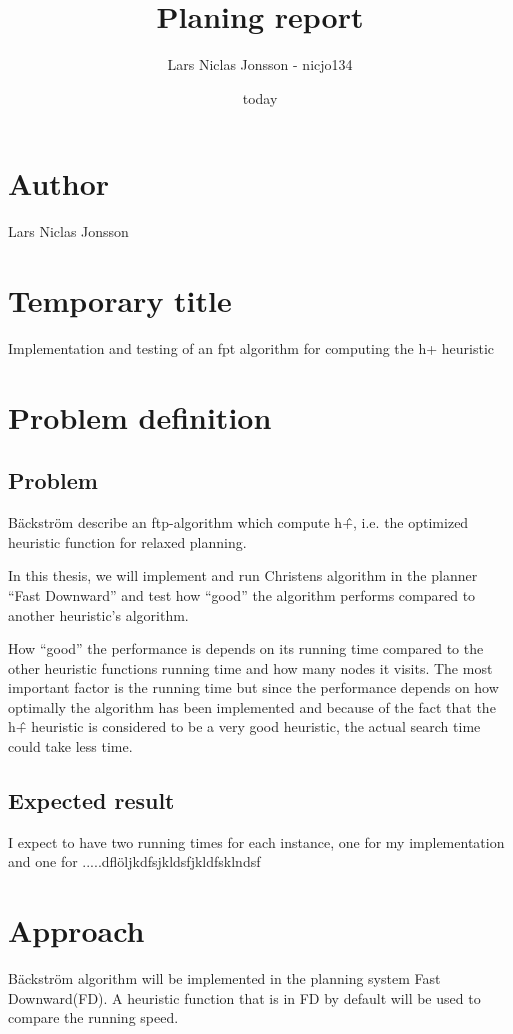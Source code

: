 \documentclass{article}
\author{Lars Niclas Jonsson - nicjo134}
\date{today}
\title{Planing report}
\begin{document}
\maketitle

\section{Author}
Lars Niclas Jonsson
\section{Temporary title}
Implementation and testing of an fpt algorithm for computing the h+ heuristic

\section{Problem definition}
\subsection{Problem}
Bäckström \cite{Backstrom2014a} describe an ftp-algorithm which compute h\^+, i.e. the optimized heuristic function for relaxed planning.

In this thesis, we will implement and run Christens algorithm in the planner “Fast Downward”\cite{Helmert2006} and test how “good” the algorithm performs compared to another heuristic’s algorithm.

How “good” the performance is depends on its running time compared to the other heuristic functions running time and how many nodes it visits. The most important factor is the running time but since the performance depends on how optimally the algorithm has been implemented and because of the fact that the h\^+ heuristic is considered to be a very good heuristic, the actual search time could take less time.

\subsection{Expected result}
I expect to have two running times for each instance, one for my implementation and one for .....dflöljkdfsjkldsfjkldfsklndsf

\section{Approach}
Bäckström algorithm will be implemented in the planning system Fast Downward(FD). A heuristic function that is in FD by default will be used to compare the running speed.
\end{document}

